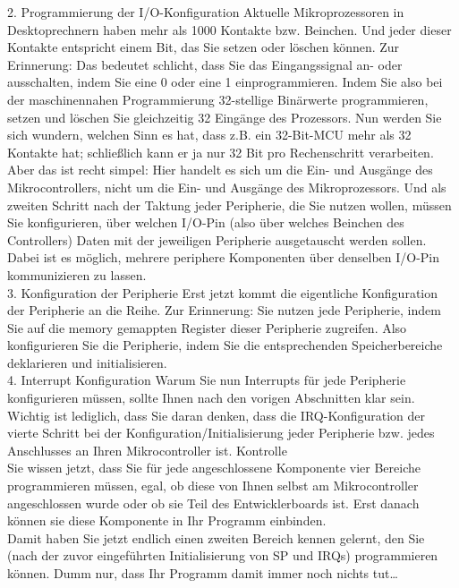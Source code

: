 2.	Programmierung der I/O-Konfiguration
Aktuelle Mikroprozessoren in Desktoprechnern haben mehr als 1000 Kontakte bzw. Beinchen. Und jeder dieser Kontakte entspricht einem Bit, das Sie setzen oder löschen können. Zur Erinnerung: Das bedeutet schlicht, dass Sie das Eingangssignal an- oder ausschalten, indem Sie eine 0 oder eine 1 einprogrammieren. Indem Sie also bei der maschinennahen Programmierung 32-stellige Binärwerte programmieren, setzen und löschen Sie gleichzeitig 32 Eingänge des Prozessors.
Nun werden Sie sich wundern, welchen Sinn es hat, dass z.B. ein 32-Bit-MCU mehr als 32 Kontakte hat; schließlich kann er ja nur 32 Bit pro Rechenschritt verarbeiten. Aber das ist recht simpel: Hier handelt es sich um die Ein- und Ausgänge des Mikrocontrollers, nicht um die Ein- und Ausgänge des Mikroprozessors.
Und als zweiten Schritt nach der Taktung jeder Peripherie, die Sie nutzen wollen, müssen Sie konfigurieren, über welchen I/O-Pin (also über welches Beinchen des Controllers) Daten mit der jeweiligen Peripherie ausgetauscht werden sollen. Dabei ist es möglich, mehrere periphere Komponenten über denselben I/O-Pin kommunizieren zu lassen.\\

3.	Konfiguration der Peripherie
Erst jetzt kommt die eigentliche Konfiguration der Peripherie an die Reihe. Zur Erinnerung: Sie nutzen jede Peripherie, indem Sie auf die memory gemappten Register dieser Peripherie zugreifen. Also konfigurieren Sie die Peripherie, indem Sie die entsprechenden Speicherbereiche deklarieren und initialisieren.\\

4.	Interrupt Konfiguration
Warum Sie nun Interrupts für jede Peripherie konfigurieren müssen, sollte Ihnen nach den vorigen Abschnitten klar sein. Wichtig ist lediglich, dass Sie daran denken, dass die IRQ-Konfiguration der vierte Schritt bei der Konfiguration/Initialisierung jeder Peripherie bzw. jedes Anschlusses an Ihren Mikrocontroller ist.
Kontrolle\\

Sie wissen jetzt, dass Sie für jede angeschlossene Komponente vier Bereiche programmieren müssen, egal, ob diese von Ihnen selbst am Mikrocontroller angeschlossen wurde oder ob sie Teil des Entwicklerboards ist. Erst danach können sie diese Komponente in Ihr Programm einbinden.\\

Damit haben Sie jetzt endlich einen zweiten Bereich kennen gelernt, den Sie (nach der zuvor eingeführten Initialisierung von SP und IRQs) programmieren können. Dumm nur, dass Ihr Programm damit immer noch nichts tut…

